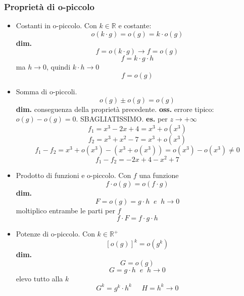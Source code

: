 \subsubsection*{Proprietà di o-piccolo}
\begin{itemize}
    \item Costanti in o-piccolo.
        \newline
        Con $k \in \mathbb{R}$ e costante:
        \[
            o(k \cdot  g) = o(g) = k \cdot  o(g)
        \]
        \textbf{dim.} 
        \[
            f = o( k \cdot  g) \rightarrow f = o(g)
        \] 
        \[
            f= k \cdot  g \cdot  h
        \]
        ma $h\rightarrow0$, quindi $k \cdot  h \rightarrow 0$
        \[
            f = o(g)
        \]
    \item Somma di o-piccoli.
        \[
            o(g) \pm o(g) = o(g)
        \]
        \textbf{dim.} conseguenza della proprietà precedente.
        \newline
        \textbf{oss.} errore tipico: $o(g) - o(g) = 0$. SBAGLIATISSIMO.
        \newline
        \textbf{es.} per $z\longrightarrow + \infty$
        \[
            f_1=x^3 -2x +4 = x^3 + o(x^3)
        \]
        \[
            f_2 = x^3 + x^2 -7 = x^3 + o(x^3)
        \]
        \[
            f_1 - f_2 = x^3 + o(x^3) -( x^3 + o(x^3)) = o(x^3) - o(x^3) \neq 0
        \]
        \[
            f_1 - f_2 = -2x +4 - x^2 + 7 
        \]
    \item Prodotto di funzioni e o-piccolo.
        \newline
        Con $f$ una funzione
        \[
            f \cdot o(g) = o(f \cdot g)  
        \]
        \newline
        \textbf{dim.} 
        \[
            F = o(g) = g \cdot h \;\; e \;\; h\rightarrow0
        \] 
        moltiplico entrambe le parti per $f$
        \[
            f \cdot F = f \cdot g \cdot h
        \]
    \item Potenze di o-piccolo.
        \newline
        Con $k \in \mathbb{R}^{+}$
        \[
            [o(g)]^k = o(g^k)  
        \]
        \textbf{dim.}
        \[
            G = o(g)
        \] 
        \[
            G = g \cdot h \;\; e \;\; h\rightarrow0
        \]
        elevo tutto alla $k$
        \[
            G^k = g^k \cdot h ^k \;\;\;\;\; H = h^k \rightarrow 0
        \]
\end{itemize}
